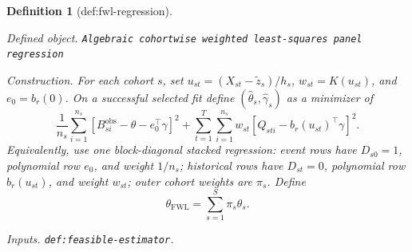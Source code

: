 \documentclass{article}
\newtheorem{definition}{Definition}
\begin{document}
\begin{definition}[def:fwl-regression]\label{def:fwl-regression}
\par\smallskip\noindent\emph{Defined object.} \texttt{Algebraic cohortwise weighted least-\allowbreak{}squares panel regression}
\par\smallskip\noindent\emph{Construction.} For each cohort \(s\), set \(u_{st}=(X_{st}-\widetilde z_s)/h_s\), \(w_{st}=K(u_{st})\), and \(e_0=b_r(0)\).  On a successful selected fit define \((\widehat\theta_s,\widehat\gamma_s)\) as a minimizer of
\[
\frac1{n_s}\sum_{i=1}^{n_s}
[B_{si}^{\mathrm{obs}}-\theta-e_0^\top\gamma]^2
+\sum_{t=1}^{T}\sum_{i=1}^{n_s}
w_{st}[Q_{sti}-b_r(u_{st})^\top\gamma]^2.
\]
Equivalently, use one block-diagonal stacked regression: event rows have \(D_{s0}=1\), polynomial row \(e_0\), and weight \(1/n_s\); historical rows have \(D_{st}=0\), polynomial row \(b_r(u_{st})\), and weight \(w_{st}\); outer cohort weights are \(\pi_s\).  Define
\[
\theta_{\mathrm{FWL}}=\sum_{s=1}^{S}\pi_s\widehat\theta_s.
\]
\par\smallskip\noindent\emph{Inputs.} \texttt{def:\allowbreak{}feasible-\allowbreak{}estimator}.
\end{definition}
\end{document}
